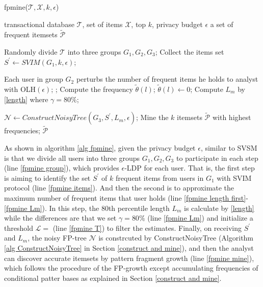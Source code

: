 \documentclass[conference]{IEEEtran}
\begin{document}
\begin{algorithm}[htbp]
  \caption{fpmine($\mathcal{T},\mathcal{X},k,\epsilon$)}
  \label{alg fpmine}
  \begin{algorithmic}[1]
  \REQUIRE transactional database $\mathcal{T}$, set of items $\mathcal{X}$, top $k$, privacy budget $\epsilon$
  \ENSURE a set of frequent itemsets $\tilde{\mathcal{P}}$

  \STATE Randomly divide $\mathcal{T}$ into three groups $G_1,G_2,G_3$; \label{fpmine group}
  \STATE Collect the items set $S^{\prime} \gets SVIM(G_1,k,\epsilon)$; \label{fpmine items}
  
  \STATE Each user in group $G_2$ perturbs the number of frequent items he holds to analyst with OLH$({\epsilon})$;\label{fpmine length first}
  ;\label{fpmine T}
    \STATE Compute the frequency $\tilde{\theta}(l)$;
      \STATE $\tilde{\theta}(l) \gets 0$;
    \ENDIF
  \ENDFOR
  \STATE Compute $L_{m}$ by \eqref{length} where $\gamma=80\%$;\label{fpmine Lm}

  \STATE $\mathcal{N} \gets ConstructNoisyTree(G_3,S^{\prime},L_m,\epsilon)$;
  \STATE Mine the $k$ itemsets $\tilde{\mathcal{P}}$ with highest frequencies; \label{fpmine mine}
  \RETURN $\tilde{\mathcal{P}}$
  \end{algorithmic}
\end{algorithm}

As shown in algorithm \ref{alg fpmine}, given the privacy budget $\epsilon$, similar to SVSM is that we divide all users into three groups $G_1,G_2,G_3$ to participate in each step (line \ref{fpmine group}), which provides $\epsilon$-LDP for each user. That is, the first step is aiming to identify the set $S^{\prime}$ of $k$ frequent items from users in $G_1$ with SVIM protocol (line \ref{fpmine items}). And then the second is to approximate the maximum number of frequent items that user holds (line \ref{fpmine length first}-\ref{fpmine Lm}). In this step, the 80th percentile length $L_m$ is calculate by \eqref{length} while the differences are that we set $\gamma=80\%$ (line \ref{fpmine Lm}) and initialize a threshold {\color{red}$\mathcal{L} = $} (line \ref{fpmine T}) to filter the estimates. Finally, on receiving $S^{\prime}$ and $L_m$, the noisy FP-tree {\color{red}$\mathcal{N}$} is constrcuted by ConstructNoisyTree (Algorithm \ref{alg ConstructNoisyTree} in Section \ref{construct and mine}), and then the analyst can discover accurate itemsets by pattern fragment growth (line \ref{fpmine mine}), which follows the procedure of the FP-growth except accumulating frequencies of conditional patter bases as explained in Section \ref{construct and mine}. 
\end{document}
